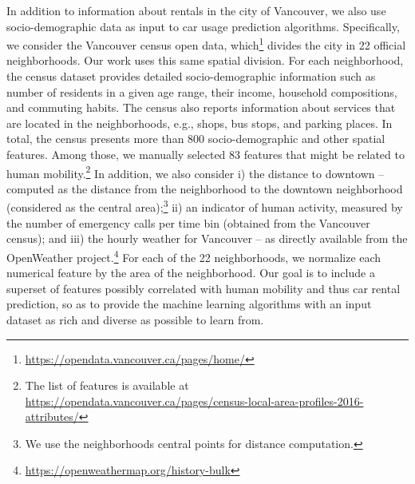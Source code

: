 In addition to information about rentals in the city of Vancouver, we also use socio-demographic data as input to car usage prediction algorithms.
Specifically, we consider the Vancouver census open data, which\footnote{\url{https://opendata.vancouver.ca/pages/home/}} divides the city in 22 official neighborhoods. Our work uses this same spatial division. 
For each neighborhood, the census dataset provides detailed socio-demographic information such as number of residents in a given age range, their income, household compositions, and commuting habits. The census also reports information about services that are located in the neighborhoods, e.g., shops, bus stops, and parking places. In total, the census presents more than 800 socio-demographic and other spatial features. Among those, we manually selected 83 features that might be related to human mobility.\footnote{The list of features is available at \url{https://opendata.vancouver.ca/pages/census-local-area-profiles-2016-attributes/}} 
In addition, we also consider i) the distance to downtown -- computed as the distance from the neighborhood to the downtown neighborhood (considered as the central area);\footnote{We use the neighborhoods central points for distance computation.} ii) an indicator of human activity, measured by the number of emergency calls per time bin (obtained from the Vancouver census);   and iii) the hourly weather for Vancouver -- as directly available from the OpenWeather project.\footnote{\url{https://openweathermap.org/history-bulk}} 
For each of the 22 neighborhoods, we normalize each numerical feature by the area of the neighborhood. 
Our goal is to include a superset of features possibly correlated with human mobility and thus car rental prediction, so as to provide the machine learning algorithms with an input dataset as rich and diverse as possible to learn from.





